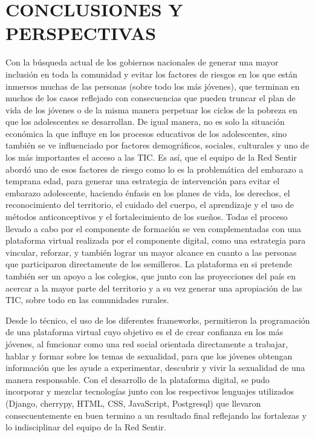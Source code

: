 \documentclass[a4paper]{article}
\begin{document}
\section{CONCLUSIONES Y PERSPECTIVAS}\label{sec:conclusiones}
Con la búsqueda actual de los gobiernos nacionales de generar una mayor inclusión en toda la comunidad y evitar los factores de riesgos en los que están inmersos muchas de las personas (sobre todo los más jóvenes), que terminan en muchos de los casos reflejado con consecuencias que pueden truncar el plan de vida de los jóvenes o de la misma manera perpetuar los ciclos de la pobreza en que los adolescentes se desarrollan. De igual manera, no es solo la situación económica la que influye en los procesos educativos de los adolescentes, sino también se ve influenciado por factores demográficos, sociales, culturales y uno de los más importantes el acceso a las TIC. Es así, que el equipo de la Red Sentir abordó uno de esos factores de riesgo como lo es la problemática del embarazo a temprana edad, para generar una estrategia de intervención para evitar el embarazo adolescente, haciendo énfasis en los planes de vida, los derechos, el reconocimiento del territorio, el cuidado del cuerpo, el aprendizaje y el uso de métodos anticonceptivos y el fortalecimiento de los sueños. Todas el proceso llevado a cabo por el componente de formación se ven complementadas con una plataforma virtual realizada por el componente digital, como una estrategia para vincular, reforzar, y también lograr un mayor alcance en cuanto a las personas que participaron directamente de los semilleros. La plataforma en si pretende también ser un apoyo a los colegios, que junto con las proyecciones del país en acercar a la mayor parte del territorio y a su vez generar una apropiación de las TIC, sobre todo en las comunidades rurales.

Desde lo técnico, el uso de los diferentes frameworks, permitieron la programación de una plataforma virtual cuyo objetivo es el de crear confianza en los más jóvenes, al funcionar como una red social orientada directamente a trabajar, hablar y formar sobre los temas de sexualidad, para que los jóvenes obtengan información que les ayude a experimentar, descubrir y vivir la sexualidad de una manera responsable. Con el desarrollo de la plataforma digital, se pudo incorporar y mezclar tecnologías junto con los respectivos lenguajes utilizados (Django, cherrypy, HTML, CSS, JavaScript, Postgresql) que llevaron consecuentemente en buen termino a un resultado final reflejando las fortalezas y lo indisciplinar del equipo de la Red Sentir.
\end{document}
